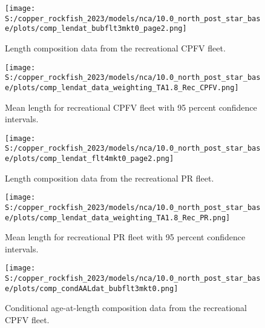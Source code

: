 \documentclass[11pt,
  letterpaper,
]{article}
\begin{document}
\pagebreak

\begin{figure}
{\centering
\texttt{[image: S:/copper\_rockfish\_2023/models/nca/10.0\_north\_post\_star\_base/plots/comp\_lendat\_bubflt3mkt0\_page2.png]}
}
\caption{Length composition data from the recreational CPFV fleet.\label{fig:rec-cpfv-len-data}}
\end{figure}

\pagebreak

\begin{figure}
{\centering
\texttt{[image: S:/copper\_rockfish\_2023/models/nca/10.0\_north\_post\_star\_base/plots/comp\_lendat\_data\_weighting\_TA1.8\_Rec\_CPFV.png]}
}
\caption{Mean length for recreational CPFV fleet with 95 percent confidence intervals.\label{fig:mean-rec-cpfv-len-data}}
\end{figure}

\pagebreak

\begin{figure}
{\centering
\texttt{[image: S:/copper\_rockfish\_2023/models/nca/10.0\_north\_post\_star\_base/plots/comp\_lendat\_flt4mkt0\_page2.png]}
}
\caption{Length composition data from the recreational PR fleet.\label{fig:rec-pr-len-data}}
\end{figure}

\pagebreak

\begin{figure}
{\centering
\texttt{[image: S:/copper\_rockfish\_2023/models/nca/10.0\_north\_post\_star\_base/plots/comp\_lendat\_data\_weighting\_TA1.8\_Rec\_PR.png]}
}
\caption{Mean length for recreational PR fleet with 95 percent confidence intervals.\label{fig:mean-rec-pr-len-data}}
\end{figure}

\begin{figure}
{\centering
\texttt{[image: S:/copper\_rockfish\_2023/models/nca/10.0\_north\_post\_star\_base/plots/comp\_condAALdat\_bubflt3mkt0.png]}
}
\caption{Conditional age-at-length composition data from the recreational CPFV fleet.\label{fig:rec-cpfv-caal-data}}
\end{figure}
\end{document}
